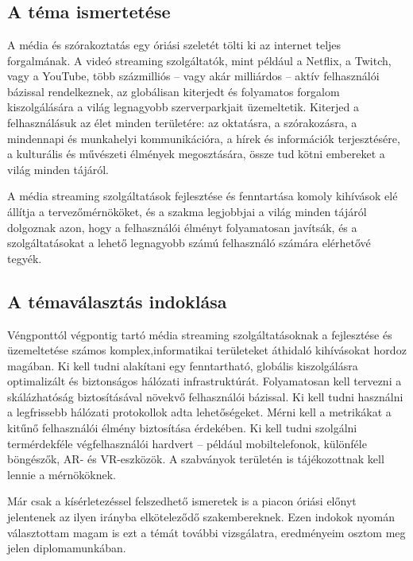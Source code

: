 \chapter{\bevezetes}

\section{A téma ismertetése}

A média és szórakoztatás egy óriási szeletét tölti ki az internet teljes forgalmának. A videó streaming szolgáltatók, mint például a Netflix, a Twitch, vagy a YouTube, több százmilliós -- vagy akár milliárdos -- aktív felhasználói bázissal rendelkeznek, az globálisan kiterjedt és folyamatos forgalom kiszolgálására a világ legnagyobb szerverparkjait üzemeltetik. Kiterjed a felhasználásuk az élet minden területére: az oktatásra, a szórakozásra, a mindennapi és munkahelyi kommunikációra, a hírek és információk terjesztésére, a kulturális és művészeti élmények megosztására, össze tud kötni embereket a világ minden tájáról.

A média streaming szolgáltatások fejlesztése és fenntartása komoly kihívások elé állítja a tervezőmérnököket, és a szakma legjobbjai a világ minden tájáról dolgoznak azon, hogy a felhasználói élményt folyamatosan javítsák, és a szolgáltatásokat a lehető legnagyobb számú felhasználó számára elérhetővé tegyék.

\section{A témaválasztás indoklása}

Véngponttól végpontig tartó média streaming szolgáltatásoknak a fejlesztése és üzemeltetése számos komplex,informatikai területeket áthidaló kihívásokat hordoz magában. Ki kell tudni alakítani egy fenntartható, globális kiszolgálásra optimalizált és biztonságos hálózati infrastruktúrát. Folyamatosan kell tervezni a skálázhatóság biztosításával növekvő felhasználói bázissal. Ki kell tudni használni a legfrissebb hálózati protokollok adta lehetőségeket. Mérni kell a metrikákat a kitűnő felhasználói élmény biztosítása érdekében. Ki kell tudni szolgálni termérdekféle végfelhasználói hardvert -- például mobiltelefonok, különféle böngészők, AR- és VR-eszközök. A szabványok területén is tájékozottnak kell lennie a mérnököknek.

Már csak a kísérletezéssel felszedhető ismeretek is a piacon óriási előnyt jelentenek az ilyen irányba elköteleződő szakembereknek. Ezen indokok nyomán választottam magam is ezt a témát további vizsgálatra, eredményeim osztom meg jelen diplomamunkában.

